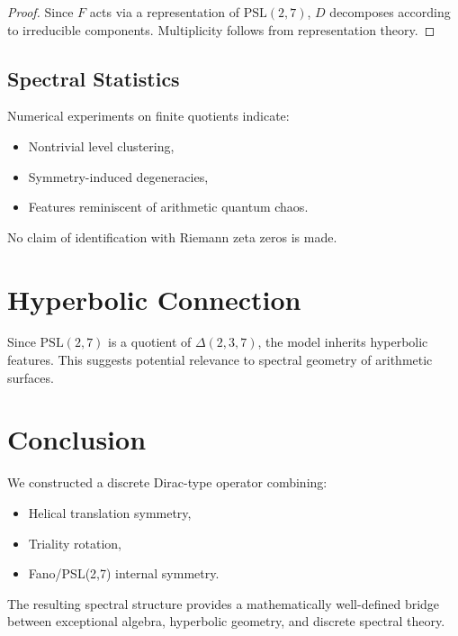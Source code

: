 \documentclass[11pt]{article}
\begin{document}
	\begin{proof}
		Since $F$ acts via a representation of
		$\mathrm{PSL}(2,7)$,
		$D$ decomposes according to irreducible components.
		Multiplicity follows from representation theory.
	\end{proof}
	
	\subsection{Spectral Statistics}
	
	Numerical experiments on finite quotients
	indicate:
	
	\begin{itemize}
		\item Nontrivial level clustering,
		\item Symmetry-induced degeneracies,
		\item Features reminiscent of arithmetic quantum chaos.
	\end{itemize}
	
	No claim of identification with
	Riemann zeta zeros is made.
	
	\section{Hyperbolic Connection}
	
	Since $\mathrm{PSL}(2,7)$ is a quotient of
	$\Delta(2,3,7)$,
	the model inherits hyperbolic features.
	This suggests potential relevance to
	spectral geometry of arithmetic surfaces.
	
	\section{Conclusion}
	
	We constructed a discrete Dirac-type operator
	combining:
	
	\begin{itemize}
		\item Helical translation symmetry,
		\item Triality rotation,
		\item Fano/PSL(2,7) internal symmetry.
	\end{itemize}
	
	The resulting spectral structure
	provides a mathematically well-defined
	bridge between exceptional algebra,
	hyperbolic geometry,
	and discrete spectral theory.
	
\end{document}
